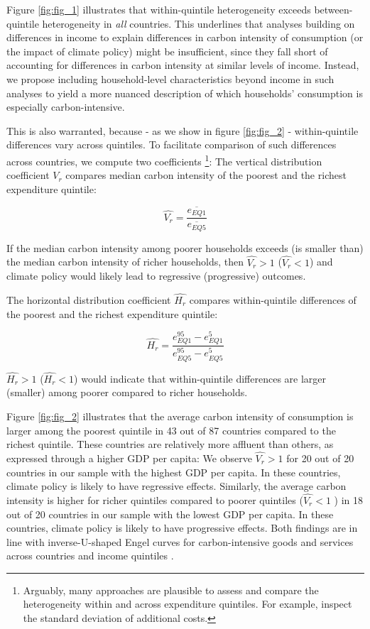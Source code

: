 \documentclass[12pt, a4paper]{article}
\begin{document}
Figure \ref{fig:fig_1} illustrates that within-quintile heterogeneity exceeds between-quintile heterogeneity in \textit{all} countries. This underlines that analyses building on differences in income to explain differences in carbon intensity of consumption (or the impact of climate policy) might be insufficient, since they fall short of accounting for differences in carbon intensity at similar levels of income. Instead, we propose including household-level characteristics beyond income in such analyses to yield a more nuanced description of which households' consumption is especially carbon-intensive.

This is also warranted, because - as we show in figure \ref{fig:fig_2} - within-quintile differences vary across quintiles. To facilitate comparison of such differences across countries, we compute two coefficients \autocite{Missbach.2024}\footnote{Arguably, many approaches are plausible to assess and compare the heterogeneity within and across expenditure quintiles. For example, \textcite{Cronin.2019} inspect the standard deviation of additional costs.}: The vertical distribution coefficient $\widehat{V_{r}}$ compares median carbon intensity of the poorest and the richest expenditure quintile:

\begin{equation}
    \widehat{V_{r}} = \frac{\overline{e_{EQ1}}}{\overline{e_{EQ5}}}
\end{equation}

If the median carbon intensity among poorer households exceeds (is smaller than) the median carbon intensity of richer households, then $\widehat{V_{r}}>1$ ($\widehat{V_{r}}<1$) and climate policy would likely lead to regressive (progressive) outcomes.

The horizontal distribution coefficient $\widehat{H_{r}}$ compares within-quintile differences of the poorest and the richest expenditure quintile:

\begin{equation}
    \widehat{H_{r}} = \frac{e_{EQ1}^{95} - e_{EQ1}^{5}}{e_{EQ5}^{95} - e_{EQ5}^{5}}
\end{equation}

$\widehat{H_{r}}>1$ ($\widehat{H_{r}}<1$) would indicate that within-quintile differences are larger (smaller) among poorer compared to richer households.

Figure \ref{fig:fig_2} illustrates that the average carbon intensity of consumption is larger among the poorest quintile in 43 out of 87 countries compared to the richest quintile. These countries are relatively more affluent than others, as expressed through a higher GDP per capita: We observe $\widehat{V_{r}}>1$ for 20 out of 20 countries in our sample with the highest GDP per capita. In these countries, climate policy is likely to have regressive effects. Similarly, the average carbon intensity is higher for richer quintiles compared to poorer quintiles ($\widehat{V_{r}}<1$ ) in 18 out of 20 countries in our sample with the lowest GDP per capita. In these countries, climate policy is likely to have progressive effects. Both findings are in line with inverse-U-shaped Engel curves for carbon-intensive goods and services across countries and income quintiles \autocite{Dorband.2019}. 
\end{document}
